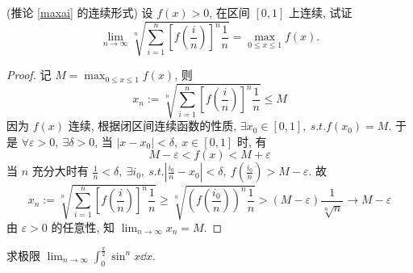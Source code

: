 \begin{example}
    (推论 \ref{maxai} 的连续形式) 设 $f(x)>0$, 在区间 $[0,1]$ 上连续,
    试证 $$\lim_{n\to\infty}\sqrt[n]{\sum_{i=1}^{n}\left[f\left(\frac{i}{n}\right)\right]^n\frac{1}{n}}=\max_{0\leqslant x\leqslant 1}f(x).$$
\end{example}
\begin{proof}
    记 $\displaystyle M=\max_{0\leqslant x\leqslant 1}f(x)$, 则 $$x_n:= \sqrt[n]{\sum_{i=1}^{n}\left[f\left(\frac{i}{n}\right)\right]^n\frac{1}{n}}\leqslant M$$
    因为 $f(x)$ 连续, 根据闭区间连续函数的性质, $\exists x_0\in[0,1],~s.t.f(x_0)=M$.
    于是 $\forall \varepsilon>0,~\exists\delta>0\text{, 当 }|x-x_0|<\delta,~x\in[0,1]$ 时, 有 $$M-\varepsilon<f(x)<M+\varepsilon$$
    当 $n$ 充分大时有 $\displaystyle \frac{1}{n}<\delta,~\exists i_0,~s.t. \left|\frac{i_0}{n}-x_0\right|<\delta,~f\left(\frac{i_0}{n}\right)>M-\varepsilon$.
    故 $$x_n:= \sqrt[n]{\sum_{i=1}^{n}\left[f\left(\frac{i}{n}\right)\right]^n\frac{1}{n}}\geqslant\sqrt[n]{\left(f\left(\frac{i_0}{n}\right)\right)^n\frac{1}{n}}>(M-\varepsilon)\frac{1}{\sqrt[n]{n}}\to M-\varepsilon$$
    由 $\varepsilon>0$ 的任意性, 知 $\displaystyle\lim_{n\to\infty}x_n=M.$
\end{proof}
\begin{example}
    求极限 $\displaystyle\lim_{n\to\infty}\int_{0}^{\frac{\pi}{2}}\sin^nx\dd x.$
\end{example}
